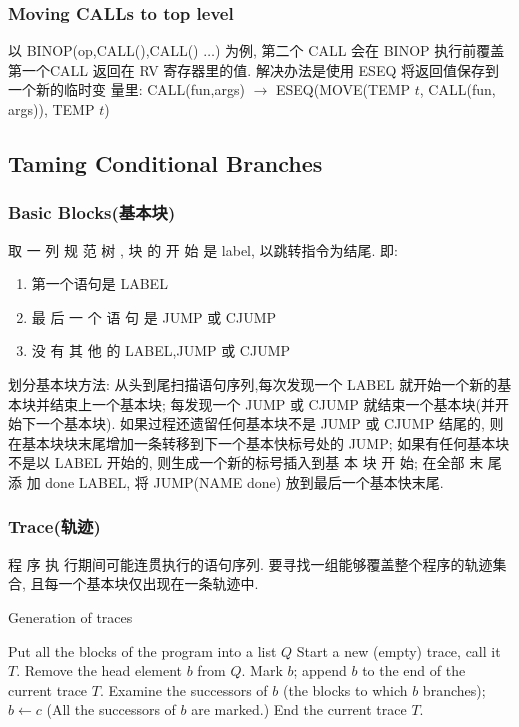 \subsubsection{Moving CALLs to top level}
以 BINOP(op,CALL(),CALL() $\dots$) 为例, 第二个 CALL 会在 BINOP 执行前覆盖第一个CALL 返回在 RV 寄存器里的值. 解决办法是使用 ESEQ 将返回值保存到一个新的临时变 量里: CALL(fun,args) $\to$ ESEQ(MOVE(TEMP $t$, CALL(fun, args)), TEMP $t$)


\subsection{Taming Conditional Branches}
\subsubsection{Basic Blocks(基本块)}
取 一 列 规 范 树 , 块 的 开 始 是 label, 以跳转指令为结尾. 即:
\begin{enumerate}
    \item 第一个语句是 LABEL
    \item 最 后 一 个 语 句 是 JUMP 或 CJUMP
    \item 没 有 其 他 的 LABEL,JUMP 或 CJUMP
\end{enumerate}

划分基本块方法: 从头到尾扫描语句序列,每次发现一个 LABEL 就开始一个新的基本块并结束上一个基本块; 每发现一个 JUMP 或 CJUMP 就结束一个基本块(并开始下一个基本块). 如果过程还遗留任何基本块不是 JUMP 或 CJUMP 结尾的, 则在基本块块末尾增加一条转移到下一个基本快标号处的 JUMP; 如果有任何基本块不是以 LABEL 开始的, 则生成一个新的标号插入到基 本 块 开 始; 在全部 末 尾 添 加 done LABEL, 将 JUMP(NAME done) 放到最后一个基本快末尾.


\subsubsection{Trace(轨迹)}
程 序 执 行期间可能连贯执行的语句序列. 要寻找一组能够覆盖整个程序的轨迹集合, 且每一个基本块仅出现在一条轨迹中.
\begin{algorithm}[H]
    \caption{Generation of traces}
    \begin{algorithmic}
        \State Put all the blocks of the program into a list $Q$
            \State Start a new (empty) trace, call it $T$.
            \State Remove the head element $b$ from $Q$.
                \State Mark $b$; append $b$ to the end of the current trace $T$.
                \State Examine the successors of $b$ (the blocks to which $b$ branches);
                    \State $b \leftarrow c$
                \EndIf
            \EndWhile
            \State (All the successors of $b$ are marked.)
            \State End the current trace $T$.
        \EndWhile
    \end{algorithmic}
\end{algorithm}


